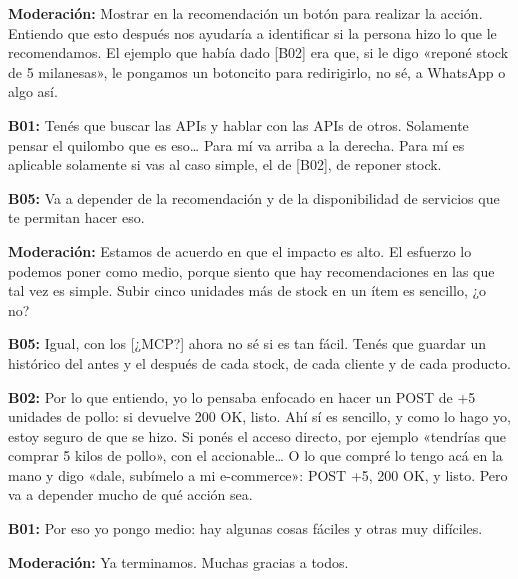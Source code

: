 \noindent\textbf{Moderación:} Mostrar en la recomendación un botón para realizar la acción. Entiendo que esto después nos ayudaría a identificar si la persona hizo lo que le recomendamos. El ejemplo que había dado [B02] era que, si le digo «reponé stock de 5 milanesas», le pongamos un botoncito para redirigirlo, no sé, a WhatsApp o algo así.

\noindent\textbf{B01:} Tenés que buscar las APIs y hablar con las APIs de otros. Solamente pensar el quilombo que es eso… Para mí va arriba a la derecha. Para mí es aplicable solamente si vas al caso simple, el de [B02], de reponer stock.

\noindent\textbf{B05:} Va a depender de la recomendación y de la disponibilidad de servicios que te permitan hacer eso.

\noindent\textbf{Moderación:} Estamos de acuerdo en que el impacto es alto. El esfuerzo lo podemos poner como medio, porque siento que hay recomendaciones en las que tal vez es simple. Subir cinco unidades más de stock en un ítem es sencillo, ¿o no?

\noindent\textbf{B05:} Igual, con los [¿MCP?] ahora no sé si es tan fácil. Tenés que guardar un histórico del antes y el después de cada stock, de cada cliente y de cada producto.

\noindent\textbf{B02:} Por lo que entiendo, yo lo pensaba enfocado en hacer un POST de +5 unidades de pollo: si devuelve 200 OK, listo. Ahí sí es sencillo, y como lo hago yo, estoy seguro de que se hizo. Si ponés el acceso directo, por ejemplo «tendrías que comprar 5 kilos de pollo», con el accionable… O lo que compré lo tengo acá en la mano y digo «dale, subímelo a mi e-commerce»: POST +5, 200 OK, y listo. Pero va a depender mucho de qué acción sea.

\noindent\textbf{B01:} Por eso yo pongo medio: hay algunas cosas fáciles y otras muy difíciles.

\noindent\textbf{Moderación:} Ya terminamos. Muchas gracias a todos.

